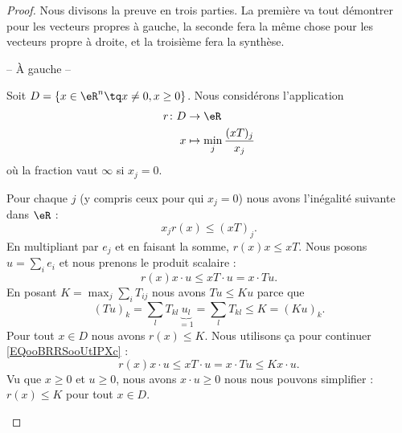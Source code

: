 \begin{proof}
    Nous divisons la preuve en trois parties. La première va tout démontrer pour les vecteurs propres à gauche, la seconde fera la même chose pour les vecteurs propre à droite, et la troisième fera la synthèse.
    \begin{center}
         -- À gauche --
    \end{center}
    Soit \( D=\{ x\in \eR^n\tq x\neq 0, x\geq 0 \}\). Nous considérons l'application
    \begin{equation}
        \begin{aligned}
            r\colon D&\to \eR \\
            x&\mapsto \min_j\frac{ (xT)_j }{ x_j } 
        \end{aligned}
    \end{equation}
    où la fraction vaut \( \infty\) si \( x_j=0\). 

    \begin{subproof}
            Pour chaque \( j\) (y compris ceux pour qui \( x_j=0\)) nous avons l'inégalité suivante dans \( \eR\) :
            \begin{equation}
                x_j r(x)\leq (xT)_j.
            \end{equation}
            En multipliant par \( e_j\) et en faisant la somme, \( r(x)x\leq xT\). Nous posons \( u=\sum_ie_i\) et nous prenons le produit scalaire :
            \begin{equation}        \label{EQooBRRSooUtIPXc}
                r(x)x\cdot u\leq xT\cdot u=x\cdot Tu.
            \end{equation}
            En posant \( K=\max_j\sum_{i}T_{ij}\) nous avons \( Tu\leq Ku\) parce que
            \begin{equation}
                (Tu)_k=\sum_{l}T_{kl}\underbrace{u_l}_{=1}=\sum_lT_{kl}\leq K= (Ku)_k.
            \end{equation}
            Pour tout \( x\in D\) nous avons \( r(x)\leq K\). Nous utilisons ça pour continuer \eqref{EQooBRRSooUtIPXc} :
            \begin{equation}
                r(x)x\cdot u\leq xT\cdot u=x\cdot Tu\leq Kx\cdot u.
            \end{equation}
            Vu que \( x\geq 0\) et \( u\geq 0\), nous avons \( x\cdot u\geq 0\) nous nous pouvons simplifier : \( r(x)\leq K\) pour tout \( x\in D\).


\end{subproof}
\end{proof}
